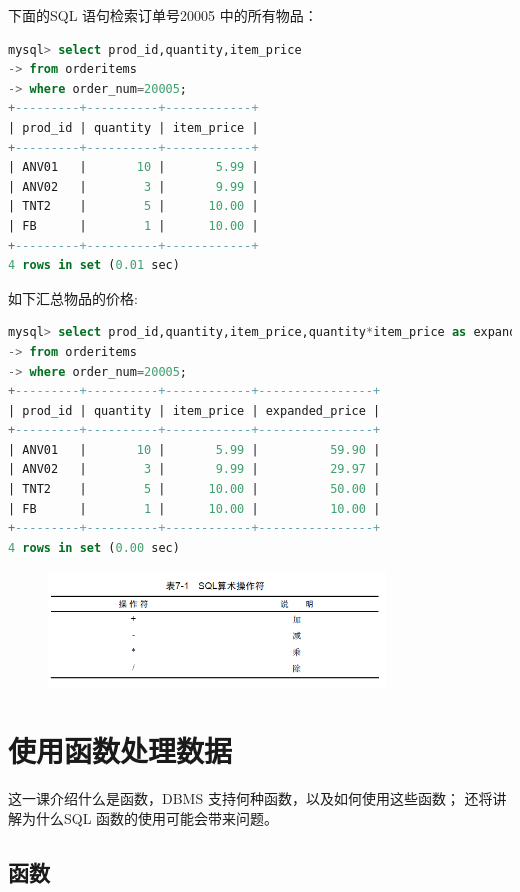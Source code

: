 \documentclass[11pt,a4paper,oneside]{book}
\begin{document}
下面的SQL 语句检索订单号20005 中的所有物品：
\begin{lstlisting}[language=sql]
mysql> select prod_id,quantity,item_price
-> from orderitems
-> where order_num=20005;
+---------+----------+------------+
| prod_id | quantity | item_price |
+---------+----------+------------+
| ANV01   |       10 |       5.99 |
| ANV02   |        3 |       9.99 |
| TNT2    |        5 |      10.00 |
| FB      |        1 |      10.00 |
+---------+----------+------------+
4 rows in set (0.01 sec)
\end{lstlisting}
如下汇总物品的价格:
\begin{lstlisting}[language=sql]
mysql> select prod_id,quantity,item_price,quantity*item_price as expanded_price
-> from orderitems
-> where order_num=20005;
+---------+----------+------------+----------------+
| prod_id | quantity | item_price | expanded_price |
+---------+----------+------------+----------------+
| ANV01   |       10 |       5.99 |          59.90 |
| ANV02   |        3 |       9.99 |          29.97 |
| TNT2    |        5 |      10.00 |          50.00 |
| FB      |        1 |      10.00 |          10.00 |
+---------+----------+------------+----------------+
4 rows in set (0.00 sec)
\end{lstlisting}
\begin{figure}[H]
	\centering
	\includegraphics[width=0.8\textwidth]{3.png}
\end{figure}

\chapter{使用函数处理数据}
这一课介绍什么是函数，DBMS 支持何种函数，以及如何使用这些函数；
还将讲解为什么SQL 函数的使用可能会带来问题。
\section{函数}
\end{document}
